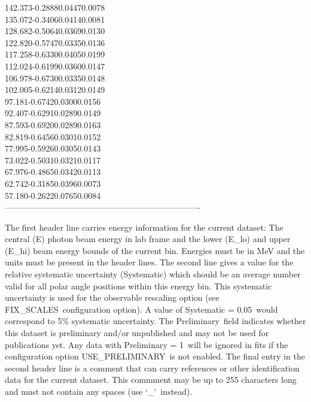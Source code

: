 \documentclass[a4paper,10pt]{article}
\def\bl{\phantom{0}}
\def\tt{\ttfamily}
\def\rm{\rmfamily}
\begin{document}
142.373\bl\bl\bl -0.2888\bl\bl\bl 0.0447\bl\bl\bl 0.0078\\
135.072\bl\bl\bl -0.3406\bl\bl\bl 0.0414\bl\bl\bl 0.0081\\
128.682\bl\bl\bl -0.5064\bl\bl\bl 0.0369\bl\bl\bl 0.0130\\
122.820\bl\bl\bl -0.5747\bl\bl\bl 0.0335\bl\bl\bl 0.0136\\
117.258\bl\bl\bl -0.6330\bl\bl\bl 0.0405\bl\bl\bl 0.0199\\
112.024\bl\bl\bl -0.6199\bl\bl\bl 0.0360\bl\bl\bl 0.0147\\
106.978\bl\bl\bl -0.6730\bl\bl\bl 0.0335\bl\bl\bl 0.0148\\
102.005\bl\bl\bl -0.6214\bl\bl\bl 0.0312\bl\bl\bl 0.0149\\
\phantom{1}97.181\bl\bl\bl -0.6742\bl\bl\bl 0.0300\bl\bl\bl 0.0156\\
\phantom{1}92.407\bl\bl\bl -0.6291\bl\bl\bl 0.0289\bl\bl\bl 0.0149\\
\phantom{1}87.593\bl\bl\bl -0.6920\bl\bl\bl 0.0289\bl\bl\bl 0.0163\\
\phantom{1}82.819\bl\bl\bl -0.6456\bl\bl\bl 0.0301\bl\bl\bl 0.0152\\
\phantom{1}77.995\bl\bl\bl -0.5926\bl\bl\bl 0.0305\bl\bl\bl 0.0143\\
\phantom{1}73.022\bl\bl\bl -0.5031\bl\bl\bl 0.0321\bl\bl\bl 0.0117\\
\phantom{1}67.976\bl\bl\bl -0.4865\bl\bl\bl 0.0342\bl\bl\bl 0.0113\\
\phantom{1}62.742\bl\bl\bl -0.3185\bl\bl\bl 0.0396\bl\bl\bl 0.0073\\
\phantom{1}57.180\bl\bl\bl -0.2622\bl\bl\bl 0.0765\bl\bl\bl 0.0084\\
----------------------------------------------------------------------\\
\rm

The first header line carries energy information for the current dataset: The central (\tt E\rm)
photon beam energy in lab frame and the lower (\tt E\_lo\rm)
and upper (\tt E\_hi\rm) beam energy bounds of the current bin. Energies must be in MeV and the units
must be present in the header lines.
The second line gives a value for the relative systematic uncertainty (\tt Systematic\rm)
which should be an average number valid for all polar angle positions within this energy bin. This systematic uncertainty
is used for the observable rescaling option (see \tt FIX\_SCALES\rm\ configuration option). A value of
\tt Systematic = 0.05\rm\ would correspond to 5\% systematic uncertainty. 
The \tt Preliminary\rm\ field indicates whether this dataset is preliminary and/or unpublished and may not be used
for publications yet. Any data with \tt Preliminary = 1\rm\ will be ignored in fits if the configuration
option \tt USE\_PRELIMINARY\rm\ is not enabled.
The final entry in the second header line is a comment that can carry references or other identification
data for the current dataset. This commment may be up to 255 characters long and must not contain any spaces 
(use `\tt \_\rm'\ instead).
\end{document}

